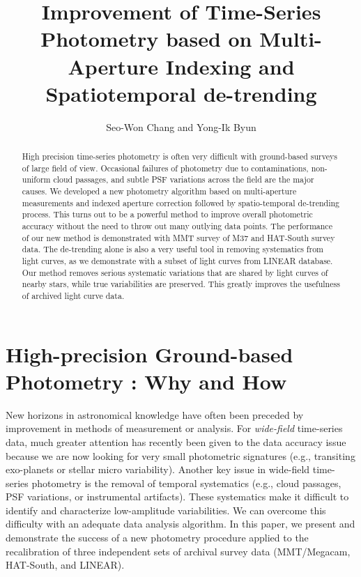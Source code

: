 \documentclass[11pt,twoside]{article}
\begin{document}
\title{Improvement of Time-Series Photometry based on Multi-Aperture
Indexing and Spatiotemporal de-trending}
\author{Seo-Won Chang and Yong-Ik Byun}

\begin{abstract}
High precision time-series photometry is often very difficult with ground-based surveys of large field of view.  Occasional failures of photometry due to contaminations, non-uniform cloud passages, and subtle PSF variations across the field are the major causes.  We developed a new photometry algorithm based on multi-aperture measurements and indexed aperture correction followed by spatio-temporal de-trending process.  This turns out to be a powerful method to improve overall photometric accuracy without the need to throw out many outlying data points.  The performance of our new method is demonstrated with MMT survey of M37 and HAT-South survey data.  The de-trending alone is also a very useful tool in removing systematics from light curves, as we demonstrate with a subset of light curves from LINEAR database.  Our method removes serious systematic variations that are shared by light curves of nearby stars, while true variabilities are preserved.  This greatly improves the usefulness of archived light curve data.
\end{abstract}


\section{High-precision Ground-based Photometry : Why and How}
New horizons in astronomical knowledge have often been preceded by improvement in methods of measurement or analysis.  For {\itshape wide-field} time-series data, much greater attention has recently been given to the data accuracy issue because we are now looking for very small photometric signatures (e.g., transiting exo-planets or stellar micro variability).  Another key issue in wide-field time-series photometry is the removal of temporal systematics (e.g., cloud passages, PSF variations, or instrumental artifacts).  These systematics make it difficult to identify and characterize low-amplitude variabilities.  We can overcome this difficulty with an adequate data analysis algorithm.  In this paper, we present and demonstrate the success of a new photometry procedure applied to the recalibration of three independent sets of archival survey data (MMT/Megacam, HAT-South, and LINEAR).
\end{document}
